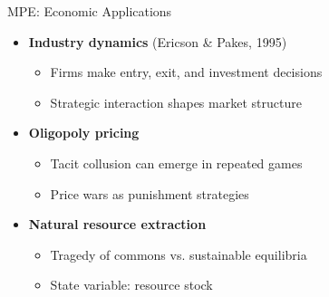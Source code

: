 \documentclass[10pt]{beamer}
\begin{document}

\begin{frame}{MPE: Economic Applications}
    \begin{itemize}
        \item \textbf{Industry dynamics} (Ericson \& Pakes, 1995)
        \begin{itemize}
            \item Firms make entry, exit, and investment decisions
            \item Strategic interaction shapes market structure
        \end{itemize}
        \vspace{0.3cm}
        \item \textbf{Oligopoly pricing}
        \begin{itemize}
            \item Tacit collusion can emerge in repeated games
            \item Price wars as punishment strategies
        \end{itemize}
        \vspace{0.3cm}
        \item \textbf{Natural resource extraction}
        \begin{itemize}
            \item Tragedy of commons vs. sustainable equilibria
            \item State variable: resource stock
        \end{itemize}
    \end{itemize}
\end{frame}


\end{document}
